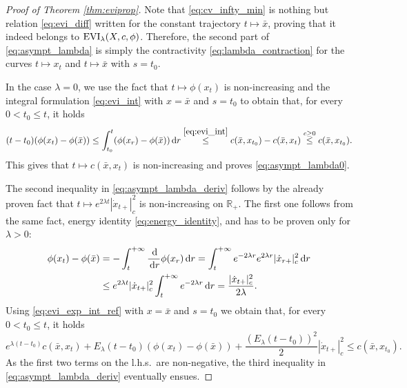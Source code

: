 \documentclass[reqno]{amsart}
\theoremstyle{plain}
\theoremstyle{remark}
\theoremstyle{plain}
\numberwithin{equation}{section}
\theoremstyle{remark}
\newcommand{\x}{\bar x}
\newcommand{\de}{{\,\rm d}}
\DeclareMathOperator{\EVI}{{\rm EVI}}
\begin{document}
\begin{proof}[Proof of Theorem \ref{thm:eviprop}]
     Note that \eqref{eq:cv_infty_min} is  nothing but relation  \eqref{eq:evi_diff} written for the  constant trajectory  $t \mapsto \x$,  proving that it indeed  belongs to $\EVI_\lambda(X,c,\phi)$. Therefore, the second part of \eqref{eq:asympt_lambda} is simply  the  contractivity  \eqref{eq:lambda_contraction} for the curves $t \mapsto x_t$ and $t \mapsto \x$ with $s=t_0$.
    


      In the case  $\lambda=0$, we use the fact that $t\mapsto \phi(x_t)$  is non-increasing and the integral formulation \eqref{eq:evi_int} with $x=\bar{x}$  and $s=t_0$ to obtain that,  for every $0 < t_0 \le t$, it holds 
    \begin{equation}\label{eq:cv_lambda0}
        (t-t_0)(\phi(x_t)-\phi(\x)) \le \int_{t_0}^t (\phi(x_r)-\phi(\x)) \, {\rm d}r  \stackrel{\eqref{eq:evi_int}}{\le} c(\x,x_{t_0})-c(\x,x_{t}) \stackrel{c \geq 0}{\le} c(\x,x_{t_0}). 
    \end{equation}
    This  gives that $t \mapsto c(\bar{x}, x_t)$ is non-increasing and proves \eqref{eq:asympt_lambda0}. 


    The second inequality in \eqref{eq:asympt_lambda_deriv} follows by the already proven fact that $t \mapsto e^{2\lambda t} |\dot{x}_{t+}|_c^2$ is non-increasing  on  $\mathbb{R_+}$.  The first one follows from the same fact,  energy identity \eqref{eq:energy_identity}, and has to be proven only for $\lambda>0$:
    \begin{align*}
        \phi(x_t)-\phi(\x)&=-\int_t^{+\infty} \frac{\de}{\de  r }\phi(x_{r}) \de r  = \int_t^{+\infty} e^{-2 \lambda r} e^{2 \lambda r}|\dot x_{r+ }|^2_c\de r \\
        & \le e^{2 \lambda t}|\dot x_{t+ }|^2_c \int_t^{+\infty} e^{-2 \lambda r} \de r = \frac{|\dot x_{t+ }|^2_c}{2\lambda}.
    \end{align*}
     Using  \eqref{eq:evi_exp_int_ref} with  $x=\x$  and $s=t_0$ we  obtain that, for every $0 < t_0 \le t$, it holds 
    \begin{equation}
    e^{\lambda(t-t_0)}c(\x,x_t)+E_\lambda(t-t_0)\left(\phi(x_t)-\phi(\x)\right)+ \frac{(E_\lambda(t-t_0)) ^2}{2}|\dot x_{t+ }|_c^2
    \le c(\x,x_{t_0}).
    \end{equation}
    As the first two terms on the  l.h.s.\  are non-negative, the third inequality in \eqref{eq:asympt_lambda_deriv} eventually ensues. 
    


\end{proof}
\end{document}
